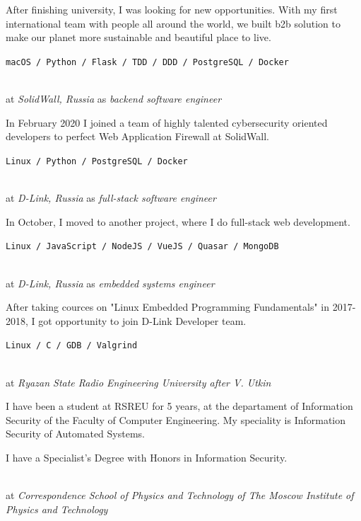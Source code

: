 After finishing university, I was looking for new opportunities. With my first
international team with people all around the world, we built b2b solution to
make our planet more sustainable and beautiful place to live.
\SmallSep

\texttt{macOS / Python / Flask / TDD / DDD / PostgreSQL / Docker}
\SmallSep


 \\
at \textit{SolidWall, Russia}
as \textit{backend software engineer}
\SmallSep

In February 2020 I joined a team of highly talented cybersecurity oriented
developers to perfect Web Application Firewall at SolidWall.
\SmallSep

\texttt{Linux / Python / PostgreSQL / Docker}
\SmallSep

 \\
at \textit{D-Link, Russia}
as \textit{full-stack software engineer}
\SmallSep

In October, I moved to another project, where I do full-stack web development.
\SmallSep

\texttt{Linux / JavaScript / NodeJS / VueJS / Quasar / MongoDB}
\SmallSep

\clearpage
\framebreak
\framebreak

 \\
at \textit{D-Link, Russia}
as \textit{embedded systems engineer}
\SmallSep

After taking cources on "Linux Embedded Programming Fundamentals" in
2017-2018, I got opportunity to join D-Link Developer team.
\SmallSep

\texttt{Linux / C / GDB / Valgrind}
\SmallSep

 \\
at \textit{Ryazan State Radio Engineering University after V. Utkin}
\SmallSep

I have been a student at RSREU for 5 years, at the departament of Information Security of the Faculty of Computer Engineering. My speciality is Information Security of Automated Systems.

I have a Specialist's Degree with Honors in Information Security.

\SmallSep

 \\
at \textit{Correspondence School of Physics and Technology of The Moscow Institute of Physics and Technology}
\SmallSep

